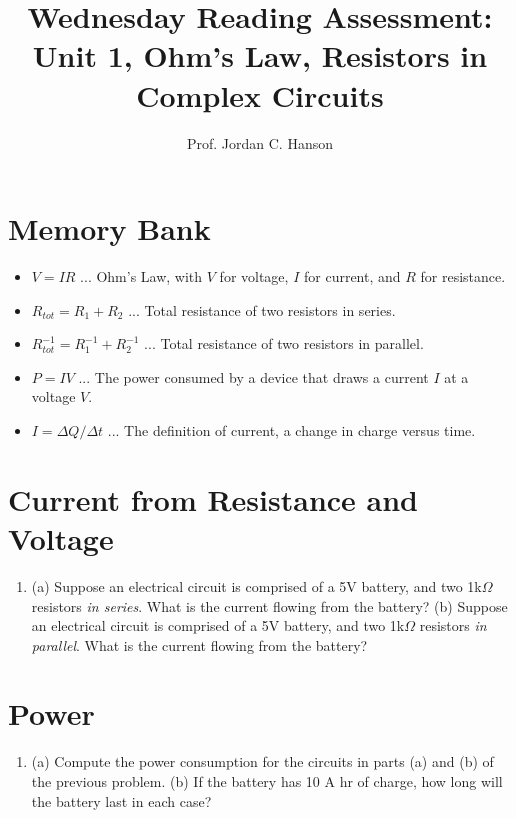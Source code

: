 \documentclass{article}
\begin{document}
\title{Wednesday Reading Assessment: Unit 1, Ohm's Law, Resistors in Complex Circuits}
\author{Prof. Jordan C. Hanson}

\maketitle

\section{Memory Bank}

\begin{itemize}
\item $V = I R$ ... Ohm's Law, with $V$ for voltage, $I$ for current, and $R$ for resistance.
\item $R_{tot} = R_1 + R_2$ ... Total resistance of two resistors in series.
\item $R_{tot}^{-1} = R_1^{-1} + R_2^{-1}$ ... Total resistance of two resistors in parallel.
\item $P = IV$ ... The power consumed by a device that draws a current $I$ at a voltage $V$.
\item $I = \Delta Q/\Delta t$ ... The definition of current, a change in charge versus time.
\end{itemize}

\section{Current from Resistance and Voltage}

\begin{enumerate}
\item (a) Suppose an electrical circuit is comprised of a 5V battery, and two 1k$\Omega$ resistors \textit{in series}.  What is the current flowing from the battery? (b) Suppose an electrical circuit is comprised of a 5V battery, and two 1k$\Omega$ resistors \textit{in parallel}.  What is the current flowing from the battery? \\ \vspace{1.5cm}
\end{enumerate}

\section{Power}

\begin{enumerate}
\item (a) Compute the power consumption for the circuits in parts (a) and (b) of the previous problem.  (b) If the battery has 10 A hr of charge, how long will the battery last in each case?
\end{enumerate}
\end{document}
